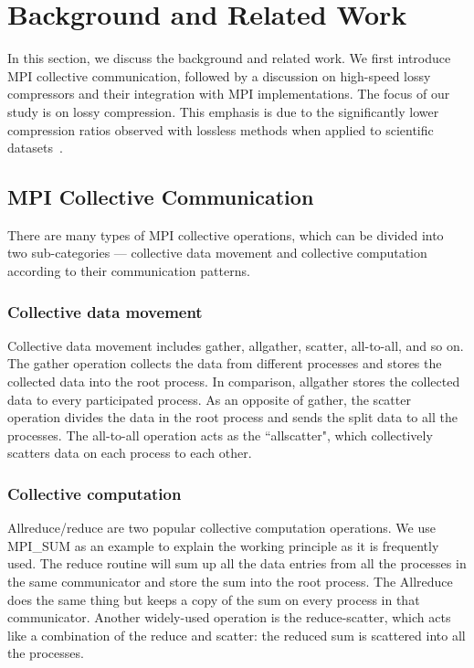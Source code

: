 \section{Background and Related Work}
\label{sec:background}
In this section, we discuss the background and related work. We first introduce MPI collective communication, followed by a discussion on high-speed lossy compressors and their integration with MPI implementations. The focus of our study is on lossy compression. This emphasis is due to the significantly lower compression ratios observed with lossless methods when applied to scientific datasets~\cite{Di2016SZ,Tao2017SZ,Huang-Exploring-Wavelet-Transform}.



\subsection{MPI Collective Communication}
\label{sec:MPI-Collectives}
There are many types of MPI collective operations, which can be divided into two sub-categories --- collective data movement and collective computation according to their communication patterns.
\subsubsection{Collective data movement}
Collective data movement includes gather, allgather, scatter, all-to-all, and so on. The gather operation collects the data from different processes and stores the collected data into the root process. In comparison, allgather stores the collected data to every participated process. As an opposite of gather, the scatter operation divides the data in the root process and sends the split data to all the processes. The all-to-all operation acts as the ``allscatter", which collectively scatters data on each process to each other. 


\subsubsection{Collective computation}
Allreduce/reduce are two popular collective computation operations. We use MPI\_SUM as an example to explain the working principle as it is frequently used. The reduce routine will sum up all the data entries from all the processes in the same communicator and store the sum into the root process. The Allreduce does the same thing but keeps a copy of the sum on every process in that communicator. Another widely-used operation is the reduce-scatter, which acts like a combination of the reduce and scatter: the reduced sum is scattered into all the processes. 



